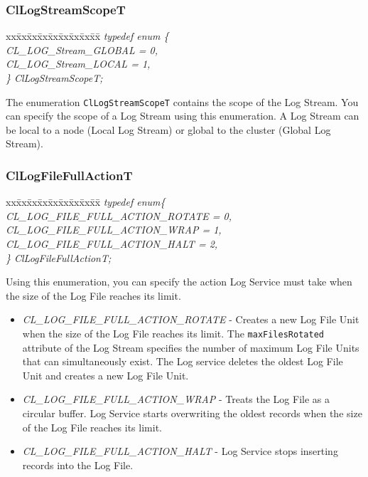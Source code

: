 \begin{flushleft}
\subsubsection{ClLogStreamScopeT}
\begin{tabbing}
xx\=xx\=xx\=xx\=xx\=xx\=xx\=xx\=xx\=\kill
\textit{typedef enum \{}\\
\>\>\>\>\textit{CL\_LOG\_Stream\_GLOBAL = 0,}\\
\>\>\>\>\textit{CL\_LOG\_Stream\_LOCAL = 1,}\\
\textit{\} ClLogStreamScopeT;}\end{tabbing}
The enumeration {\tt{ClLogStreamScopeT}} contains the scope of the Log Stream. You can specify the scope of a Log Stream using this 
enumeration. A Log Stream can be local to a node (Local Log Stream) or global to the cluster (Global Log Stream).


\subsubsection{ClLogFileFullActionT}
\begin{tabbing}
xx\=xx\=xx\=xx\=xx\=xx\=xx\=xx\=xx\=\kill
\textit{typedef enum\{}\\
\>\>\>\>\textit{CL\_LOG\_FILE\_FULL\_ACTION\_ROTATE = 0,}\\
\>\>\>\>\textit{CL\_LOG\_FILE\_FULL\_ACTION\_WRAP = 1,}\\
\>\>\>\>\textit{CL\_LOG\_FILE\_FULL\_ACTION\_HALT = 2,}\\
\textit{\} ClLogFileFullActionT;}\end{tabbing}
 Using this enumeration, you can specify the action Log Service must take when the size of the Log File reaches its limit.
\begin{itemize}
\item \textit{CL\_\-LOG\_\-FILE\_\-FULL\_\-ACTION\_\-ROTATE} - Creates a new Log File Unit when the size of the Log File reaches its limit. 
The {\tt{maxFilesRotated}} attribute of the Log Stream specifies the number of maximum Log File Units that can simultaneously exist.
The Log service deletes the oldest Log File Unit and creates a new Log File Unit.
\item
\textit{CL\_\-LOG\_\-FILE\_\-FULL\_\-ACTION\_\-WRAP} - Treats the Log File as a circular buffer. Log Service starts overwriting the oldest 
records when the size of the Log File reaches its limit.
\item
\textit{CL\_\-LOG\_\-FILE\_\-FULL\_\-ACTION\_\-HALT} - Log Service stops inserting records into the Log File.
\end{itemize}





\end{flushleft}
